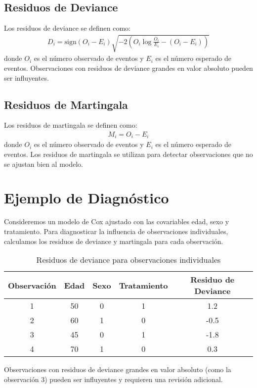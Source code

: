\documentclass[a4paper]{report} %
\begin{document}
\subsection{Residuos de Deviance}
Los residuos de deviance se definen como:
\begin{eqnarray*}
D_i = \text{sign}(O_i - E_i) \sqrt{-2 \left(O_i \log \frac{O_i}{E_i} - (O_i - E_i)\right)}
\end{eqnarray*}
donde $O_i$ es el n\'umero observado de eventos y $E_i$ es el n\'umero esperado de eventos. Observaciones con residuos de deviance grandes en valor absoluto pueden ser influyentes.

\subsection{Residuos de Martingala}
Los residuos de martingala se definen como:
\begin{eqnarray*}
M_i = O_i - E_i
\end{eqnarray*}
donde $O_i$ es el n\'umero observado de eventos y $E_i$ es el n\'umero esperado de eventos. Los residuos de martingala se utilizan para detectar observaciones que no se ajustan bien al modelo.

\section{Ejemplo de Diagn\'ostico}
Consideremos un modelo de Cox ajustado con las covariables edad, sexo y tratamiento. Para diagnosticar la influencia de observaciones individuales, calculamos los residuos de deviance y martingala para cada observaci\'on.

\begin{table}[h]
\centering
\begin{tabular}{|c|c|c|c|c|}
\hline
Observaci\'on & Edad & Sexo & Tratamiento & Residuo de Deviance \\
\hline
1 & 50 & 0 & 1 & 1.2 \\
2 & 60 & 1 & 0 & -0.5 \\
3 & 45 & 0 & 1 & -1.8 \\
4 & 70 & 1 & 0 & 0.3 \\
\hline
\end{tabular}
\caption{Residuos de deviance para observaciones individuales}
\end{table}

Observaciones con residuos de deviance grandes en valor absoluto (como la observaci\'on 3) pueden ser influyentes y requieren una revisi\'on adicional.
\end{document}
